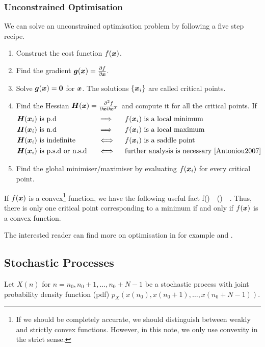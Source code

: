 \subsubsection{Unconstrained Optimisation}
We can solve an unconstrained optimisation problem by following a five step recipe.
\begin{enumerate}
  \item Construct the cost function $f(\boldsymbol{x})$.
  \item Find the gradient $\boldsymbol{g}(\boldsymbol{x})=\frac{\partial f}{\partial\boldsymbol{x}}$.
  \item Solve $\boldsymbol{g}(\boldsymbol{x})=\boldsymbol{0}$ for $\boldsymbol{x}$. The solutions $\{\boldsymbol{x}_i\}$ are called critical points.
  \item Find the Hessian $\boldsymbol{H}(\boldsymbol{x})=\frac{\partial^2 f}{\partial\boldsymbol{x}\partial\boldsymbol{x}^T}$ and compute it for all the critical points. If
\begin{alignat*}{3}
  &\vect{H}(\vect{x}_i)\text{ is p.d}           &\ &\implies &\ &f(\vect{x}_i)\text{ is a local minimum}\\
  &\vect{H}(\vect{x}_i)\text{ is n.d}           &\ &\implies &\ &f(\vect{x}_i)\text{ is a local maximum}\\
  &\vect{H}(\vect{x}_i)\text{ is indefinite}    &\ &\iff     &\ &f(\vect{x}_i)\text{ is a saddle point}\\
  &\vect{H}(\vect{x}_i)\text{ is p.s.d or n.s.d}&\ &\iff     &\ &\text{further analysis is necessary \cite[p.~41]{Antoniou2007}}
\end{alignat*}
  \item Find the global minimiser/maximiser by evaluating $f(\boldsymbol{x}_i)$ for every critical point.
\end{enumerate}
If $f(\boldsymbol{x})$ is a convex\footnote{If we should be completely accurate, we should distinguish between weakly and strictly convex functions. However, in this note, we only use convexity in the strict sense.} function, we have the following useful fact \cite[p.~57]{Antoniou2007}
\bmathnt
  f()\ \iff\ ()\forall\ \ .
\emathnt
Thus, there is only one critical point corresponding to a minimum if and only if $f(\boldsymbol{x})$ is a convex function.

The interested reader can find more on optimisation in for example \cite{Antoniou2007} and \cite{Boyd2004}.

\subsection{Stochastic Processes}
Let $X(n)$ for $n=n_0,n_0+1,\ldots,n_0+N-1$ be a stochastic process with joint probability density function (pdf) $p_X(x(n_0),x(n_0+1),\ldots,x(n_0+N-1))$.
